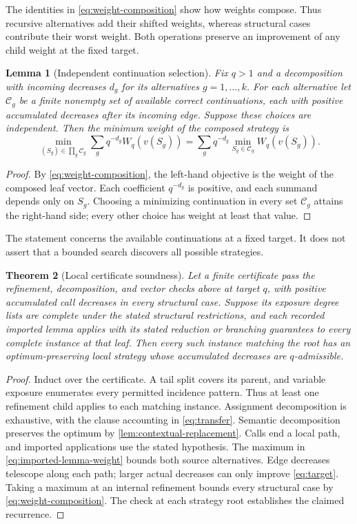\documentclass[11pt]{article}
\newtheorem{theorem}{Theorem}
\newtheorem{lemma}[theorem]{Lemma}
\theoremstyle{definition}
\theoremstyle{remark}
\begin{document}
The identities in \cref{eq:weight-composition} show how weights compose.
Thus recursive alternatives add their shifted weights, whereas structural
cases contribute their worst weight. Both operations preserve an improvement
of any child weight at the fixed target.

\begin{lemma}[Independent continuation selection]
\label{lem:weight-selection}
Fix $q>1$ and a decomposition with incoming decreases $d_g$ for its
alternatives $g=1,\ldots,k$. For each alternative let $\mathcal C_g$ be
a finite nonempty set of available correct continuations, each with positive
accumulated decreases after its incoming edge. Suppose these choices are
independent. Then the minimum weight of the composed strategy is
\begin{equation}
 \min_{(S_g)\in\prod_g\mathcal C_g}
   \sum_g q^{-d_g}W_q(v(S_g))
 =\sum_g q^{-d_g}\min_{S_g\in\mathcal C_g}W_q(v(S_g)).
 \label{eq:independent-selection}
\end{equation}
\end{lemma}
\begin{proof}
By \cref{eq:weight-composition}, the left-hand objective is the weight of
the composed leaf vector. Each coefficient $q^{-d_g}$ is positive, and
each summand depends only on $S_g$. Choosing a minimizing continuation
in every set $\mathcal C_g$ attains the right-hand side; every other
choice has weight at least that value.
\end{proof}
The statement concerns the available continuations at a fixed target.
It does not assert that a bounded search discovers all possible strategies.

\begin{theorem}[Local certificate soundness]
\label{thm:local-soundness}
Let a finite certificate pass the refinement, decomposition, and vector
checks above at target $q$, with positive accumulated call decreases in
every structural case. Suppose its exposure degree lists are complete
under the stated structural restrictions, and each recorded imported lemma
applies with its stated reduction or branching guarantees to every complete
instance at that leaf. Then every such instance
matching the root has an optimum-preserving local strategy whose accumulated
decreases are $q$-admissible.
\end{theorem}
\begin{proof}
Induct over the certificate. A tail split covers its parent, and variable
exposure enumerates every permitted incidence pattern. Thus at least one
refinement child applies to each matching instance. Assignment decomposition
is exhaustive, with the clause accounting in \cref{eq:transfer}. Semantic
decomposition preserves the optimum by \cref{lem:contextual-replacement}.
Calls end a local path, and imported applications use the stated hypothesis.
The maximum in \cref{eq:imported-lemma-weight} bounds both source alternatives.
Edge decreases telescope along each path; larger actual decreases can only
improve \cref{eq:target}. Taking a maximum at an internal refinement bounds
every structural case by \cref{eq:weight-composition}.
The check at each strategy root establishes the
claimed recurrence.
\end{proof}
\end{document}
